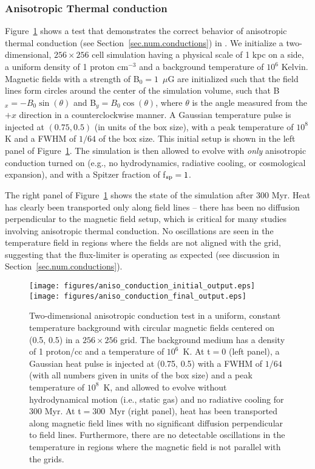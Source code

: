 \subsubsection{Anisotropic Thermal conduction}
\label{sec.tests.conduct}

Figure~\ref{fig.conduct} shows a test that demonstrates the correct
behavior of anisotropic thermal conduction (see
Section~\ref{sec.num.conductions}) in \enzo. We initialize a
two-dimensional, $256 \times 256$ cell simulation having a physical
scale of 1 kpc on a side, a uniform density of 1 proton cm$^{-3}$ and
a background temperature of $10^6$ Kelvin.  Magnetic fields with a
strength of B$_0 = 1$~$\mu$G are initialized such that the field lines
form circles around the center of the simulation volume, such that
B$_x = -B_0\sin(\theta)$ and B$_y = B_0\cos(\theta)$, where $\theta$
is the angle measured from the $+x$ direction in a counterclockwise
manner.  A Gaussian temperature pulse is injected at $(0.75, 0.5)$ (in
units of the box size), with a peak temperature of $10^8$ K and a FWHM
of $1/64$ of the box size.  This initial setup is shown in the left
panel of Figure~\ref{fig.conduct}.  The simulation is then allowed to
evolve with \textit{only} anisotropic conduction turned on (e.g., no
hydrodynamics, radiative cooling, or cosmological expansion), and with
a Spitzer fraction of f$_{\rm sp} = 1$.

The right panel of Figure~\ref{fig.conduct} shows the state of the
simulation after 300 Myr.  Heat has clearly been transported only
along field lines -- there has been no diffusion perpendicular to the
magnetic field setup, which is critical for many studies involving
anisotropic thermal conduction.  No oscillations are seen in the
temperature field in regions where the fields are not aligned with the
grid, suggesting that the flux-limiter is operating as expected (see
discussion in Section~\ref{sec.num.conductions}).

\begin{figure}
\begin{center}
\texttt{[image: figures/aniso\_conduction\_initial\_output.eps]}
\texttt{[image: figures/aniso\_conduction\_final\_output.eps]}
\caption{Two-dimensional anisotropic conduction test in a uniform,
constant temperature background with circular magnetic fields centered
on (0.5, 0.5) in a $256 \times 256$ grid. The background medium has a
density of 1 proton/cc and a temperature of $10^6$~K.  At t$ = 0$
(left panel), a Gaussian heat pulse is injected at (0.75, 0.5) with a
FWHM of $1/64$ (with all numbers given in units of the box size) and a
peak temperature of $10^8$~K, and allowed to evolve without
hydrodynamical motion (i.e., static gas) and no radiative cooling for
300 Myr.  At t$ = 300$~Myr (right panel), heat has been transported
along magnetic field lines with no significant diffusion perpendicular
to field lines. Furthermore, there are no detectable oscillations in
the temperature in regions where the magnetic field is not parallel
with the grids.}
\label{fig.conduct}
\end{center}
\end{figure}
